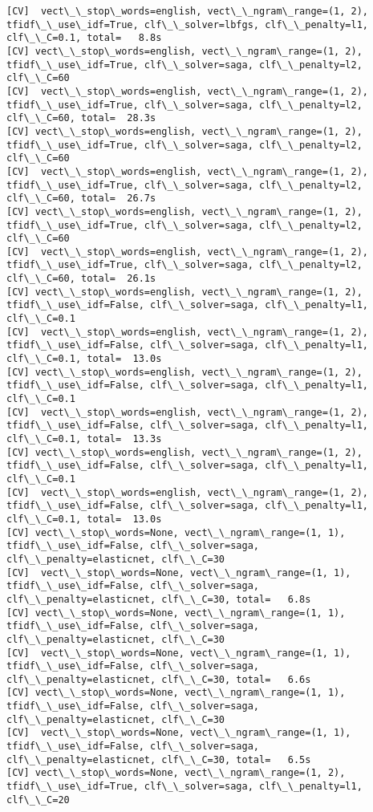 \documentclass[11pt]{article}
\begin{document}
    \begin{Verbatim}[commandchars=\\\{\}]
[CV]  vect\_\_stop\_words=english, vect\_\_ngram\_range=(1, 2), tfidf\_\_use\_idf=True, clf\_\_solver=lbfgs, clf\_\_penalty=l1, clf\_\_C=0.1, total=   8.8s
[CV] vect\_\_stop\_words=english, vect\_\_ngram\_range=(1, 2), tfidf\_\_use\_idf=True, clf\_\_solver=saga, clf\_\_penalty=l2, clf\_\_C=60 
[CV]  vect\_\_stop\_words=english, vect\_\_ngram\_range=(1, 2), tfidf\_\_use\_idf=True, clf\_\_solver=saga, clf\_\_penalty=l2, clf\_\_C=60, total=  28.3s
[CV] vect\_\_stop\_words=english, vect\_\_ngram\_range=(1, 2), tfidf\_\_use\_idf=True, clf\_\_solver=saga, clf\_\_penalty=l2, clf\_\_C=60 
[CV]  vect\_\_stop\_words=english, vect\_\_ngram\_range=(1, 2), tfidf\_\_use\_idf=True, clf\_\_solver=saga, clf\_\_penalty=l2, clf\_\_C=60, total=  26.7s
[CV] vect\_\_stop\_words=english, vect\_\_ngram\_range=(1, 2), tfidf\_\_use\_idf=True, clf\_\_solver=saga, clf\_\_penalty=l2, clf\_\_C=60 
[CV]  vect\_\_stop\_words=english, vect\_\_ngram\_range=(1, 2), tfidf\_\_use\_idf=True, clf\_\_solver=saga, clf\_\_penalty=l2, clf\_\_C=60, total=  26.1s
[CV] vect\_\_stop\_words=english, vect\_\_ngram\_range=(1, 2), tfidf\_\_use\_idf=False, clf\_\_solver=saga, clf\_\_penalty=l1, clf\_\_C=0.1 
[CV]  vect\_\_stop\_words=english, vect\_\_ngram\_range=(1, 2), tfidf\_\_use\_idf=False, clf\_\_solver=saga, clf\_\_penalty=l1, clf\_\_C=0.1, total=  13.0s
[CV] vect\_\_stop\_words=english, vect\_\_ngram\_range=(1, 2), tfidf\_\_use\_idf=False, clf\_\_solver=saga, clf\_\_penalty=l1, clf\_\_C=0.1 
[CV]  vect\_\_stop\_words=english, vect\_\_ngram\_range=(1, 2), tfidf\_\_use\_idf=False, clf\_\_solver=saga, clf\_\_penalty=l1, clf\_\_C=0.1, total=  13.3s
[CV] vect\_\_stop\_words=english, vect\_\_ngram\_range=(1, 2), tfidf\_\_use\_idf=False, clf\_\_solver=saga, clf\_\_penalty=l1, clf\_\_C=0.1 
[CV]  vect\_\_stop\_words=english, vect\_\_ngram\_range=(1, 2), tfidf\_\_use\_idf=False, clf\_\_solver=saga, clf\_\_penalty=l1, clf\_\_C=0.1, total=  13.0s
[CV] vect\_\_stop\_words=None, vect\_\_ngram\_range=(1, 1), tfidf\_\_use\_idf=False, clf\_\_solver=saga, clf\_\_penalty=elasticnet, clf\_\_C=30 
[CV]  vect\_\_stop\_words=None, vect\_\_ngram\_range=(1, 1), tfidf\_\_use\_idf=False, clf\_\_solver=saga, clf\_\_penalty=elasticnet, clf\_\_C=30, total=   6.8s
[CV] vect\_\_stop\_words=None, vect\_\_ngram\_range=(1, 1), tfidf\_\_use\_idf=False, clf\_\_solver=saga, clf\_\_penalty=elasticnet, clf\_\_C=30 
[CV]  vect\_\_stop\_words=None, vect\_\_ngram\_range=(1, 1), tfidf\_\_use\_idf=False, clf\_\_solver=saga, clf\_\_penalty=elasticnet, clf\_\_C=30, total=   6.6s
[CV] vect\_\_stop\_words=None, vect\_\_ngram\_range=(1, 1), tfidf\_\_use\_idf=False, clf\_\_solver=saga, clf\_\_penalty=elasticnet, clf\_\_C=30 
[CV]  vect\_\_stop\_words=None, vect\_\_ngram\_range=(1, 1), tfidf\_\_use\_idf=False, clf\_\_solver=saga, clf\_\_penalty=elasticnet, clf\_\_C=30, total=   6.5s
[CV] vect\_\_stop\_words=None, vect\_\_ngram\_range=(1, 2), tfidf\_\_use\_idf=True, clf\_\_solver=saga, clf\_\_penalty=l1, clf\_\_C=20 

    \end{Verbatim}
\end{document}

